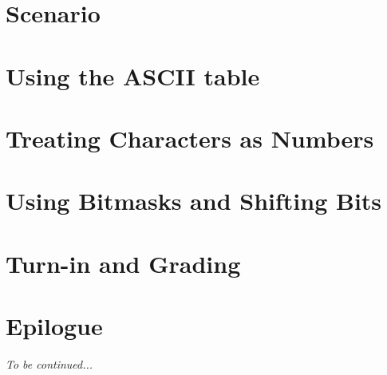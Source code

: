 





\renewcommand{\labnumber}{\keyboardlabnumber}
\renewcommand{\labname}{Bit Manipulation Lab}
\renewcommand{\shortlabname}{keyboardlab}
\renewcommand{\collaborationrules}{\keyboardlabcollaboration}
\renewcommand{\duedate}{\keyboardlabdue}

\newcommand{\tab}{\ensuremath{\longrightarrow}}
\newcommand{\nl}{\ensuremath{\hookleftarrow}}

\pagelayout

\labidentifier



\softwareengineeringfrontmatter

\section*{Scenario}                         \FirstDayOnTheJob

\section{Using the ASCII table}             

\section{Treating Characters as Numbers}    

\section{Using Bitmasks and Shifting Bits}  

\section{Turn-in and Grading}               

\section*{Epilogue}                         \HasKeyboard

\textit{To be continued...}


